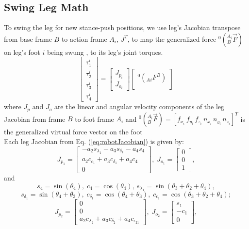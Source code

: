 \documentclass[]{article}
\begin{document}
\subsection{Swing Leg Math} 
To swing the leg for new stance-push positions, we use leg's Jacobian \cite{craig_introduction_2009} transpose  from base frame $B$ to action frame $A_i$, $J^T$, to map the generalized force  $^0(_B^{A_i}\vec{F})$ on leg's foot $i$ being swung , to its leg's joint torques.
\begin{equation}
	\begin{bmatrix}
		\tau_1^i 	\\
		\tau_2^i	\\
		\tau_3^i	\\
		\tau_4^i	
	\end{bmatrix}
	= 
	\begin{bmatrix}
		J_{p_i}\\	J_{o_i}
	\end{bmatrix}
	\begin{bmatrix}
		^0(_A{_i}F^B)	\\
	\end{bmatrix}
\end{equation} 
where $J_p$ and $J_o$ are the linear and angular velocity components of the leg Jacobian from frame $B$ to foot frame $A_i$ and $^0(_B^{A_i}\vec{F})=[f_{x_i}\,f_{y_i}\,f_{z_i}\,n_{x_i}\,n_{y_i}\,n_{z_i}]^T$ is the generalized virtual force vector on the foot\\
Each leg Jacobian from Eq. (\ref{eq:robotJacobian}) is given by:\cite{craig_introduction_2009}
\begin{equation}
J_{p_1}=
\begin{bmatrix}
-a_{{2}}s_{{\lambda_{{1}}}}-a_{{3}}s_{{
		\delta_{{1}}}}-a_{{4}}s_{{4}} 	\\
a_{{2}}c_{{\epsilon_
		{{1}}}}+a_{{3}}c_{{\delta_{{1}}}}+a_{{4}}c_{{4}} \\
0	
\end{bmatrix}, \nonumber
\;J_{o_1}=
\begin{bmatrix}
0\\0\\1
\end{bmatrix}, \nonumber
\end{equation}
and \[s_4=\sin(\theta_4),\;c_4=\cos(\theta_4),\, s_{\lambda_{1}}=\sin(\theta_3+\theta_2+\theta_4),\]\[s_{\delta_{1}}=\sin(\theta_4+\theta_3),\;c_{\delta_{1}}=\cos(\theta_4+\theta_3),\;c_{\epsilon_{1}}=\cos(\theta_3+\theta_2+\theta_4);\]
\begin{equation}
J_{p_2}=
\begin{bmatrix}
0\\ 0\\ a_{{2}}c_{{\lambda_{{2}}}}+a_{{3}}c_{{\delta_{{2}}}}+a_{{4}}c_{{
		\epsilon_{{21}}}} 
\end{bmatrix},
\;J_{o_2}=
\begin{bmatrix}
s_1\\-c_1\\0
\end{bmatrix},\nonumber
\end{equation}
\end{document}
